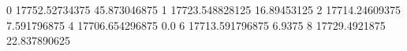 0 17752.52734375 45.873046875
1 17723.548828125 16.89453125
2 17714.24609375 7.591796875
4 17706.654296875 0.0
6 17713.591796875 6.9375
8 17729.4921875 22.837890625
